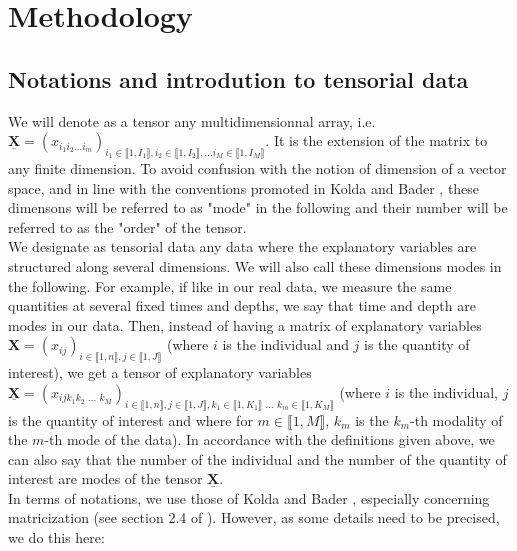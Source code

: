 \documentclass[10pt]{article}
\begin{document}
\section{Methodology}

\subsection{Notations and introdution to tensorial data}

We will denote as a tensor any multidimensionnal array, i.e. $\underline{\mathbf{X}} = (x_{i_1i_2...i_m})_{i_1 \in \llbracket 1, I_1 \rrbracket, i_2 \in \llbracket 1, I_2 \rrbracket, ... i_M \in \llbracket 1, I_M \rrbracket}$. It is the extension of the matrix to any finite dimension. To avoid confusion with the notion of dimension of a vector space, and in line with the conventions promoted in Kolda and Bader \cite{conventions}, these dimensons will be referred to as "mode" in the following and their number will be referred to as the "order" of the tensor.\\
\indent We designate as tensorial data any data where the explanatory variables are structured along several dimensions. We will also call these dimensions modes in the following. For example, if like in our real data, we measure the same quantities at several fixed times and depths, we say that time and depth are modes in our data. Then, instead of having a matrix of explanatory variables $\mathbf{X} = (x_{ij})_{i \in \llbracket 1, n \rrbracket, j \in \llbracket 1, J \rrbracket}$ (where $i$ is the individual and $j$ is the quantity of interest), we get a tensor of explanatory variables $\underline{\mathbf{X}} = (x_{ijk_1k_2\text{ ... }k_M})_{i \in \llbracket 1, n \rrbracket, j \in \llbracket 1, J \rrbracket, k_1 \in \llbracket 1, K_1 \rrbracket \text{ ... } k_m \in\llbracket 1, K_M \rrbracket } $  (where $i$ is the individual, $j$ is the quantity of interest and where for $m \in \llbracket 1, M \rrbracket$, $k_m$ is the $k_m$-th modality of the $m$-th mode of the data). In accordance with the definitions given above, we can also say that the number of the individual and the number of the quantity of interest are modes of the tensor $\underline{\mathbf{X}}$. \\

\noindent In terms of notations, we use those of Kolda and Bader \cite{conventions}, especially concerning matricization (see section 2.4 of \cite{conventions}). However, as some details need to be precised, we do this here:\\
\end{document}
